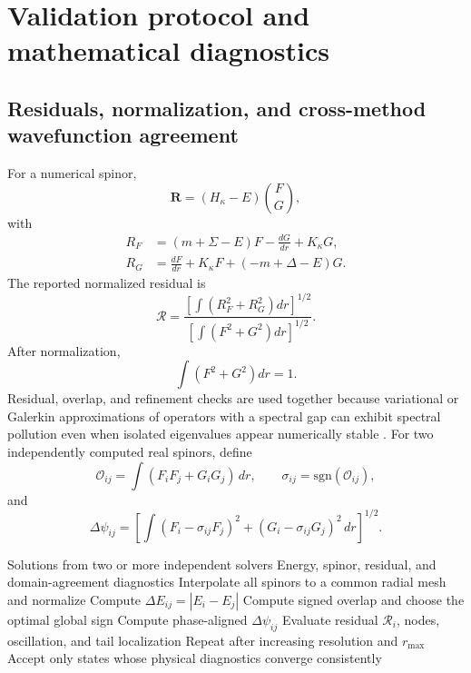 \documentclass[a4paper,fleqn]{cas-dc}
\begin{document}
\section{Validation protocol and mathematical diagnostics}
\subsection{Residuals, normalization, and cross-method wavefunction agreement}
For a numerical spinor,
\begin{equation}
\mathbf R=(H_\kappa-E)\binom{F}{G},
\end{equation}
with
\begin{align}
R_F&=(m+\Sigma-E)F-\frac{dG}{dr}+K_\kappa G,\\
R_G&=\frac{dF}{dr}+K_\kappa F+(-m+\Delta-E)G.
\end{align}
The reported normalized residual is
\begin{equation}
\mathcal R=
\frac{
\left[\int(R_F^2+R_G^2)dr\right]^{1/2}}
{\left[\int(F^2+G^2)dr\right]^{1/2}}.
\end{equation}
After normalization,
\begin{equation}
\int(F^2+G^2)dr=1.
\end{equation}
Residual, overlap, and refinement checks are used together because variational
or Galerkin approximations of operators with a spectral gap can exhibit
spectral pollution even when isolated eigenvalues appear numerically stable
\cite{Grant1982,Lewin2010}.
For two independently computed real spinors, define
\begin{equation}
\mathcal O_{ij}=\int(F_iF_j+G_iG_j)\,dr,
\qquad
\sigma_{ij}=\mathrm{sgn}(\mathcal O_{ij}),
\end{equation}
and
\begin{equation}
\Delta\psi_{ij}=
\left[
\int
(F_i-\sigma_{ij}F_j)^2+
(G_i-\sigma_{ij}G_j)^2\,dr
\right]^{1/2}.
\end{equation}


\begin{algorithm}[t]
\caption{Cross-method validation of an identified physical state}
\label{alg:validate}
\begin{algorithmic}[1]
\Require Solutions from two or more independent solvers
\Ensure Energy, spinor, residual, and domain-agreement diagnostics
\State Interpolate all spinors to a common radial mesh and normalize
\State Compute $\Delta E_{ij}=|E_i-E_j|$
\State Compute signed overlap and choose the optimal global sign
\State Compute phase-aligned $\Delta\psi_{ij}$
\EndFor
{}
\State Evaluate residual $\mathcal R_i$, nodes, oscillation, and tail localization
\State Repeat after increasing resolution and $r_{\max}$
\EndFor
\State Accept only states whose physical diagnostics converge consistently
\end{algorithmic}
\end{algorithm}
\end{document}
